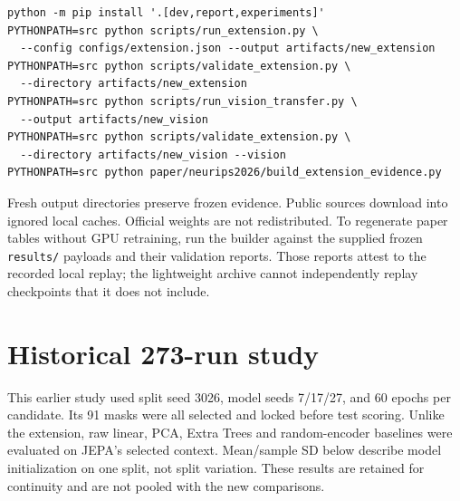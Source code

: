 \documentclass{article}
\begin{document}
\begin{verbatim}
python -m pip install '.[dev,report,experiments]'
PYTHONPATH=src python scripts/run_extension.py \
  --config configs/extension.json --output artifacts/new_extension
PYTHONPATH=src python scripts/validate_extension.py \
  --directory artifacts/new_extension
PYTHONPATH=src python scripts/run_vision_transfer.py \
  --output artifacts/new_vision
PYTHONPATH=src python scripts/validate_extension.py \
  --directory artifacts/new_vision --vision
PYTHONPATH=src python paper/neurips2026/build_extension_evidence.py
\end{verbatim}
Fresh output directories preserve frozen evidence. Public sources download into ignored local caches. Official weights are not redistributed. To regenerate paper tables without GPU retraining, run the builder against the supplied frozen \texttt{results/} payloads and their validation reports. Those reports attest to the recorded local replay; the lightweight archive cannot independently replay checkpoints that it does not include.

\section{Historical 273-run study}\label{app:historical}
This earlier study used split seed 3026, model seeds 7/17/27, and 60 epochs per candidate. Its 91 masks were all selected and locked before test scoring. Unlike the extension, raw linear, PCA, Extra Trees and random-encoder baselines were evaluated on JEPA's selected context. Mean/sample SD below describe model initialization on one split, not split variation. These results are retained for continuity and are not pooled with the new comparisons.
\end{document}
